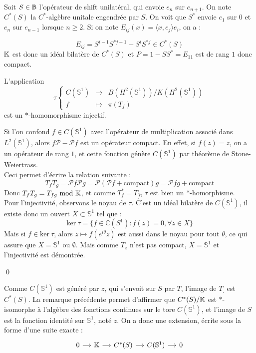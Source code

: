 Soit $S\in \mathbb B$ l'opérateur de shift unilatéral, qui envoie $e_n$ sur $e_{n+1}$. On note $C^*(S)$ la $C^*$-algèbre unitale engendrée par $S$. On voit que $S^*$ envoie $e_1$ sur $0$ et $e_n$ sur $e_{n-1}$ lorsque $n\geq 2$. Si on note $E_{ij}(x)=\langle x,e_j\rangle e_i$, on a :

\[E_{ij} = S^{i-1}S^{*j-1}-S^{i}S^{*j}\in C^*(S)\]
$\mathbb K $ est donc un idéal bilatère de $C^*(S)$ et $P=1-SS^* = E_{11}$ est de rang $1$ donc compact.\\

\begin{lem}
L'application 
\[\tau \left\{\begin{array}{rcl} C(\mathbb S^1)  & \rightarrow & B(H^2(\mathbb S^1))/K(H^2(\mathbb S^1)) \\ 
f & \mapsto & \pi(T_f)\end{array}\right.\]
est un $*$-homomorphisme injectif.
\end{lem}

\begin{dem}
Si l'on confond $f\in C(\mathbb S^1)$ avec l'opérateur de multiplication associé dans $L^2(\mathbb S^1)$, alors $f\mathcal P -\mathcal Pf$ est un opérateur compact. En effet, si $f(z)=z$, on a un opérateur de rang $1$, et cette fonction génère $C(\mathbb S^1)$ par théorème de Stone-Weiertrass. \\

Ceci permet d'écrire la relation suivante :
\[T_f T_g =\mathcal P f\mathcal P g =\mathcal P (\mathcal P f + \text{compact}) g = \mathcal P f g + \text{compact}\]
Donc $T_f T_g = T_{fg} \ \text{mod} \  \mathbb K$, et comme $T_f^*=T_{\overline f}$, $\tau$ est bien un $*$-homorphisme.\\

Pour l'injectivité, observons le noyau de $\tau$. C'est un idéal bilatère de $C(\mathbb S^1)$, il existe donc un ouvert $X \subset \mathbb S^1$ tel que :
\[\text{ker}\ \tau =\{f \in \mathbb C(S^1) : f(z)=0,\forall z \in X\}\]
Mais si $f\in \text{ker}\ \tau$, alors $z\mapsto f(e^{i\theta}z)$ est aussi dans le noyau pour tout $\theta$, ce qui assure que $X=\mathbb S^1$ ou $\emptyset$. Mais comme $T_z$ n'est pas compact, $X=\mathbb S^1$ et l'injectivité est démontrée.

\qed
\end{dem}
Comme $C(\mathbb S^1)$ est généré par $z$, qui s'envoit sur $S$ par $T$, l'image de $T_{.}$ est $C^*(S)$. La remarque précédente permet d'affirmer que $C^*(S)/\mathbb K$ est $*$-isomorphe à l'algèbre des fonctions continues sur le tore $C(\mathbb S^1)$, et l'image de $S$ est la fonction identité sur $\mathbb S^1$, noté $z$. On a donc une extension, écrite sous la forme d'une suite exacte :
\[\begin{tikzcd}[column sep =small] 0 \arrow{r} & \K \arrow{r} & C^*(S) \arrow{r} & C(\mathbb S ^1) \arrow{r} & 0 \end{tikzcd}\]

